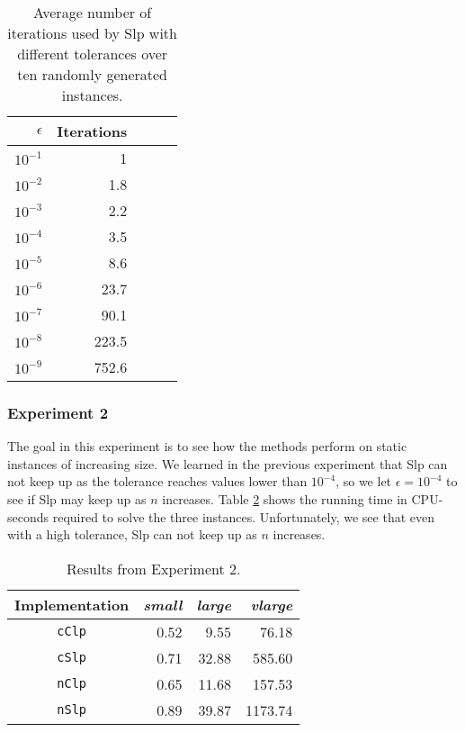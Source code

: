 \begin{table}[ht!]
\centering
\caption{Average number of iterations used by Slp with different tolerances
         over ten randomly generated instances.}
\label{table:expiters}
\begin{tabular}{rrrrr}
$\epsilon$ & Iterations \\ \hline
$10^{-1}$  & 1 \\
$10^{-2}$  & 1.8 \\
$10^{-3}$  & 2.2 \\
$10^{-4}$  & 3.5 \\
$10^{-5}$  & 8.6 \\
$10^{-6}$  & 23.7 \\
$10^{-7}$  & 90.1 \\
$10^{-8}$  & 223.5 \\
$10^{-9}$  & 752.6
\end{tabular}
\end{table}

\subsubsection{Experiment 2}
The goal in this experiment is to see how the methods perform on static instances
of increasing size.
We learned in the previous experiment that Slp can not keep up as the tolerance
reaches values lower than $10^{-4}$, so we let $\epsilon = 10^{-4}$ to see if
Slp may keep up as $n$ increases.
Table \ref{table:eps4instances} shows the running time in CPU-seconds required
to solve the three instances.
Unfortunately, we see that even with a high tolerance, Slp can not keep up as
$n$ increases.

\begin{table}
\centering
\caption{Results from Experiment 2.}
\label{table:eps4instances}
\begin{tabular}{crrr}
\textrm{Implementation} & \textit{small} & \textit{large} & \textit{vlarge} \\ \hline
\texttt{cClp}           & 0.52           & 9.55           & 76.18 \\
\texttt{cSlp}           & 0.71           & 32.88          & 585.60 \\
\texttt{nClp}           & 0.65           & 11.68          & 157.53 \\
\texttt{nSlp}           & 0.89           & 39.87          & 1173.74
\end{tabular}
\end{table}

